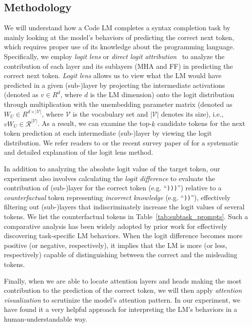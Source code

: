 \subsection{Methodology} \label{subsec:methodology}
We will understand how a Code LM completes a syntax completion task by mainly looking at the model's behaviors of predicting the correct next token, which requires proper use of its knowledge about the programming language. Specifically, we employ \emph{logit lens} or \emph{direct logit attribution}~\cite{nostalgebraist2020blog} to analyze the contribution of each layer and its sublayers (MHA and FF) in predicting the correct next token. \emph{Logit lens} allows us to view what the LM would have predicted in a given (sub-)layer by projecting the intermediate activations (denoted as $v \in {R}^d$, where $d$ is the LM dimension) onto the logit distribution through multiplication with the unembedding parameter matrix (denoted as $W_U \in {R}^{d \times |\mathcal{V}|}$, where $\mathcal{V}$ is the vocabulary set and $|\mathcal{V}|$ denotes its size), i.e., $v W_U \in \mathcal{R}^{|\mathcal{V}|}$. As a result, we can examine the top-$k$ candidate tokens for the next token prediction at each intermediate (sub-)layer by viewing the logit distribution. We refer readers to \citet{nostalgebraist2020blog} or the recent survey paper of \citet{rai2024practical} for a systematic and detailed explanation of the logit lens method.

In addition to analyzing the absolute logit value of the target token, our experiment also involves calculating the \emph{logit difference} to evaluate the contribution of (sub-)layer for the correct token (e.g. {``\lstinline|)))|''}) relative to a \emph{counterfactual} token representing \emph{incorrect knowledge} (e.g. {``\lstinline|))|''}), effectively filtering out (sub-)layers that indiscriminately increase the logit values of several tokens. We list the counterfactual tokens in Table~\ref{tab:subtask_prompts}. Such a comparative analysis has been widely adopted by prior work \cite{vig2020investigating, meng2022locating, wang2022interpretabilitywildcircuitindirect} for effectively discovering task-specific LM behaviors. When the logit difference becomes more positive (or negative, respectively), it implies that the LM is more (or less, respectively) capable of distinguishing between the correct and the misleading tokens.

Finally, when we are able to locate attention layers and heads making the most contribution to the prediction of the correct token, we will then apply \emph{attention visualization} to scrutinize the model's attention pattern. In our experiment, we have found it a very helpful approach for interpreting the LM's behaviors in a human-understandable way.

